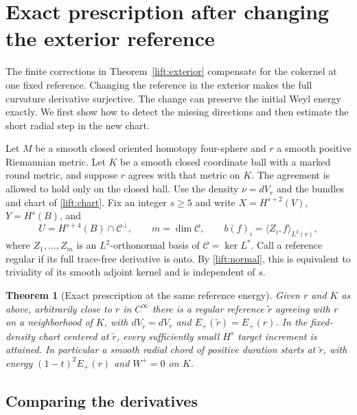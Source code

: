 \documentclass[11pt]{article}
\numberwithin{equation}{section}
\newtheorem{theorem}{Theorem}[section]
\theoremstyle{definition}
\theoremstyle{remark}
\begin{document}
\section{Exact prescription after changing the exterior reference}
\label{msreg:section}

The finite corrections in Theorem~\ref{lift:exterior} compensate
for the cokernel at one fixed reference. Changing the reference in
the exterior makes the full curvature derivative surjective. The
change can preserve the initial Weyl energy exactly. We first show
how to detect the missing directions and then estimate the short
radial step in the new chart.

Let \(M\) be a smooth closed oriented homotopy four-sphere and \(r\)
a smooth positive Riemannian metric. Let \(K\) be a smooth closed
coordinate ball with a marked round metric, and suppose \(r\)
agrees with that metric on \(K\). The agreement is allowed to
hold only on the closed ball. Use the density \(\nu=dV_r\) and
the bundles and chart of \eqref{lift:chart}. Fix an integer \(s\ge5\)
and write \(X=H^{s+2}(V)\), \(Y=H^s(B)\), and
\[
 U=H^{s+4}(B)\cap\mathcal C^\perp,\qquad
 m=\dim\mathcal C,\qquad b(f)_i=\langle Z_i,f\rangle_{L^2(r)},
\]
where \(Z_1,\ldots,Z_m\) is an \(L^2\)-orthonormal basis of
\(\mathcal C=\ker L^*\). Call a reference regular if its full
trace-free derivative is onto. By \eqref{lift:normal}, this is
equivalent to triviality of its smooth adjoint kernel and is
independent of \(s\).

\begin{theorem}[Exact prescription at the same reference energy]\label{msreg:density}
Given \(r\) and \(K\) as above, arbitrarily close to \(r\) in
\(C^\infty\) there is a regular reference \(\tilde r\) agreeing with
\(r\) on a neighborhood of \(K\), with
\(dV_{\tilde r}=dV_r\) and \(E_+(\tilde r)=E_+(r)\).
In the fixed-density chart centered at \(\tilde r\), every sufficiently
small \(H^s\) target increment is attained. In particular a smooth
radial chord of positive duration starts at \(\tilde r\), with energy
\((1-t)^2E_+(r)\) and \(W^+=0\) on \(K\).
\end{theorem}

\subsection{Comparing the derivatives}
\end{document}
